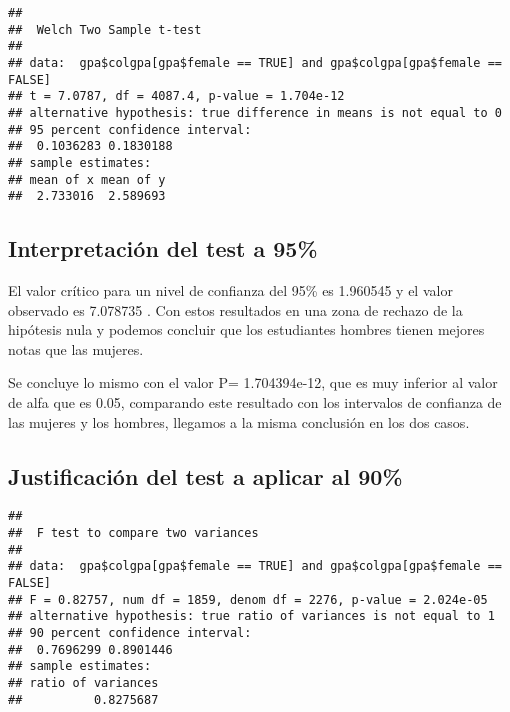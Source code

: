 \documentclass[
]{article}
\newenvironment{Shaded}{\begin{snugshade}}{\end{snugshade}}
\newcommand{\AttributeTok}[1]{\textcolor[rgb]{0.80,0.80,0.80}{#1}}
\newcommand{\CommentTok}[1]{\textcolor[rgb]{0.50,0.62,0.50}{#1}}
\newcommand{\ConstantTok}[1]{\textcolor[rgb]{0.86,0.64,0.64}{\textbf{#1}}}
\newcommand{\FloatTok}[1]{\textcolor[rgb]{0.75,0.75,0.82}{#1}}
\newcommand{\FunctionTok}[1]{\textcolor[rgb]{0.94,0.94,0.56}{#1}}
\newcommand{\NormalTok}[1]{\textcolor[rgb]{0.80,0.80,0.80}{#1}}
\newcommand{\SpecialCharTok}[1]{\textcolor[rgb]{0.86,0.64,0.64}{#1}}
\begin{document}
\begin{verbatim}
## 
##  Welch Two Sample t-test
## 
## data:  gpa$colgpa[gpa$female == TRUE] and gpa$colgpa[gpa$female == FALSE]
## t = 7.0787, df = 4087.4, p-value = 1.704e-12
## alternative hypothesis: true difference in means is not equal to 0
## 95 percent confidence interval:
##  0.1036283 0.1830188
## sample estimates:
## mean of x mean of y 
##  2.733016  2.589693
\end{verbatim}

\hypertarget{interpretaciuxf3n-del-test-a-95}{%
\subsection{Interpretación del test a
95\%}\label{interpretaciuxf3n-del-test-a-95}}

El valor crítico para un nivel de confianza del 95\% es 1.960545 y el
valor observado es 7.078735 . Con estos resultados en una zona de
rechazo de la hipótesis nula y podemos concluir que los estudiantes
hombres tienen mejores notas que las mujeres.

Se concluye lo mismo con el valor P= 1.704394e-12, que es muy inferior
al valor de alfa que es 0.05, comparando este resultado con los
intervalos de confianza de las mujeres y los hombres, llegamos a la
misma conclusión en los dos casos.

\hypertarget{justificaciuxf3n-del-test-a-aplicar-al-90}{%
\subsection{Justificación del test a aplicar al
90\%}\label{justificaciuxf3n-del-test-a-aplicar-al-90}}

\begin{Shaded}
\end{Shaded}

\begin{verbatim}
## 
##  F test to compare two variances
## 
## data:  gpa$colgpa[gpa$female == TRUE] and gpa$colgpa[gpa$female == FALSE]
## F = 0.82757, num df = 1859, denom df = 2276, p-value = 2.024e-05
## alternative hypothesis: true ratio of variances is not equal to 1
## 90 percent confidence interval:
##  0.7696299 0.8901446
## sample estimates:
## ratio of variances 
##          0.8275687
\end{verbatim}
\end{document}
